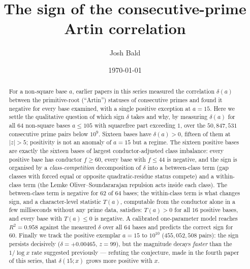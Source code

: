 \documentclass[11pt,reqno]{amsart}
\theoremstyle{plain}
\theoremstyle{definition}
\begin{document}
\title[The sign of the consecutive-prime Artin correlation]
{The sign of the consecutive-prime Artin correlation}

\author{Josh Bald}
\address{Ontario, Canada}


\date{\today}

\begin{abstract}
For a non-square base $a$, earlier papers in this series measured the
correlation $\delta(a)$ between the primitive-root (``Artin'') statuses of
consecutive primes and found it negative for every base examined, with a
single positive exception at $a = 15$. Here we settle the qualitative
question of which sign $\delta$ takes and why, by measuring $\delta(a)$ for
all $64$ non-square bases $a \le 105$ with squarefree part exceeding $1$,
over the $50{,}847{,}531$ consecutive prime pairs below $10^9$. Sixteen bases
have $\delta(a) > 0$, fifteen of them at $|z| > 5$; positivity is not an
anomaly of $a=15$ but a regime. The sixteen positive bases are exactly the
sixteen bases of largest conductor-adjusted class imbalance: every positive
base has conductor $f \ge 60$, every base with $f \le 44$ is negative, and
the sign is organised by a \emph{class-competition} decomposition of
$\delta$ into a between-class term (gap classes with forced equal or opposite
quadratic-residue status compete) and a within-class term (the Lemke
Oliver--Soundararajan repulsion acts inside each class). The between-class
term is negative for $62$ of $64$ bases; the within-class term is what
changes sign, and a character-level statistic $T(a)$, computable from the
conductor alone in a few milliseconds without any prime data, satisfies:
$T(a) > 0$ for all $16$ positive bases, and every base with $T(a) \le 0$ is
negative. A calibrated one-parameter model reaches $R^2 = 0.958$ against the
measured $\delta$ over all $64$ bases and predicts the correct sign for
$60$. Finally we track the positive exemplar $a = 15$ to $10^{10}$
($455{,}052{,}508$ pairs): the sign persists decisively
($\delta = +0.00465$, $z = 99$), but the magnitude decays \emph{faster} than
the $1/\log x$ rate suggested previously --- refuting the conjecture, made in
the fourth paper of this series, that $\delta(15;x)$ grows more positive
with $x$.
\end{abstract}
\end{document}

